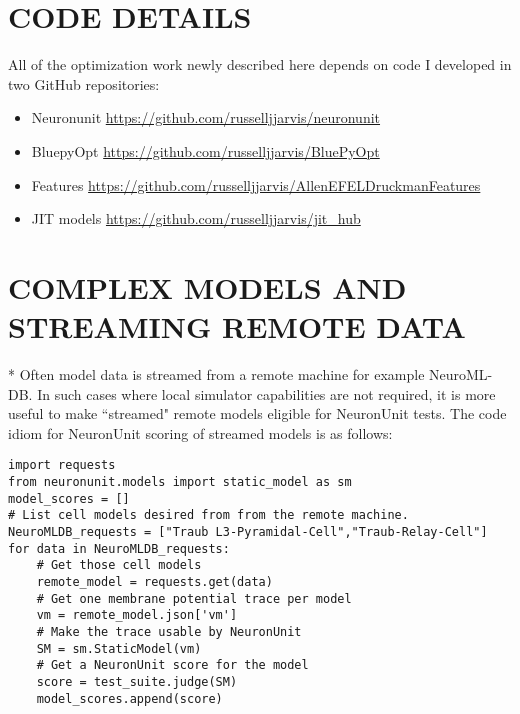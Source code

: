 
\renewcommand{\thesubsection}{\Alph{subsection}}

\label{sec:appendix}
\chapter{CODE DETAILS}

All of the optimization work newly described here depends on code I developed in two GitHub repositories:
\begin{itemize}
\item Neuronunit \url{https://github.com/russelljjarvis/neuronunit}
\item BluepyOpt \url{https://github.com/russelljjarvis/BluePyOpt}
\item Features \url{https://github.com/russelljjarvis/AllenEFELDruckmanFeatures}
\item JIT models \url{https://github.com/russelljjarvis/jit_hub}
\end{itemize}

\chapter{COMPLEX MODELS AND STREAMING REMOTE DATA}*
\label{sec:streaming}
Often model data is streamed from a remote machine for example NeuroML-DB.
In such cases where local simulator capabilities are not required, it is more useful to make ``streamed" remote models eligible for NeuronUnit tests.
The code idiom for NeuronUnit scoring of streamed models is as follows:

\begin{verbatim}
import requests
from neuronunit.models import static_model as sm
model_scores = []
# List cell models desired from from the remote machine.
NeuroMLDB_requests = ["Traub L3-Pyramidal-Cell","Traub-Relay-Cell"]
for data in NeuroMLDB_requests:
    # Get those cell models    
    remote_model = requests.get(data)
    # Get one membrane potential trace per model
    vm = remote_model.json['vm']
    # Make the trace usable by NeuronUnit
    SM = sm.StaticModel(vm)
    # Get a NeuronUnit score for the model
    score = test_suite.judge(SM)
    model_scores.append(score)
\end{verbatim}
\label{code:idiom2}

